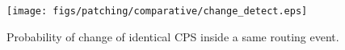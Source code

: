 \begin{figure}
\begin{center}
\texttt{[image: figs/patching/comparative/change\_detect.eps]}
\caption{Probability of change of identical CPS inside a same routing event.}
\label{fig:savings.comp}
\end{center}
\end{figure}


%
%
%
%
%
%


